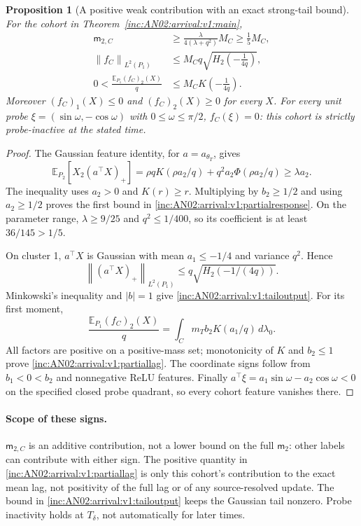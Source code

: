 \documentclass[11pt]{article}
\numberwithin{equation}{section}
\newtheorem{proposition}[theorem]{Proposition}
\theoremstyle{remark}
\newcommand{\E}{\mathbb E}
\newcommand{\dd}{\,d}
\newcommand{\norm}[1]{\left\lVert#1\right\rVert}
\begin{document}
\begin{proposition}[A positive weak contribution with an exact strong-tail bound]
\label{inc:AN02:arrival:v1:observables}
For the cohort in Theorem~\ref{inc:AN02:arrival:v1:main},
\begin{align}
 \mathsf m_{2,C}
 &\ge\frac{\lambda}{4(\lambda+q^2)}M_C
 \ge\frac15M_C,
 \label{inc:AN02:arrival:v1:partialresponse}\\
 \norm{f_C}_{L^2(P_1)}
 &\le M_Cq\sqrt{H_2\!\left(-\frac1{4q}\right)},
 \label{inc:AN02:arrival:v1:tailoutput}\\
 0<\frac{\E_{P_1}(f_C)_2(X)}q
 &\le M_CK\!\left(-\frac1{4q}\right).
 \label{inc:AN02:arrival:v1:partiallag}
\end{align}
Moreover $(f_C)_1(X)\le0$ and $(f_C)_2(X)\ge0$ for every $X$.
For every unit probe $\xi=(\sin\omega,-\cos\omega)$ with
$0\le\omega\le\pi/2$, $f_C(\xi)=0$: this cohort is strictly
probe-inactive at the stated time.
\end{proposition}
\begin{proof}
The Gaussian feature identity, for $a=a_{\theta_T}$, gives
\[
 \E_{P_2}[X_2(a^\top X)_+]
 =\rho qK(\rho a_2/q)+q^2a_2\Phi(\rho a_2/q)
 \ge\lambda a_2.
\]
The inequality uses $a_2>0$ and $K(r)\ge r$.
Multiplying by $b_2\ge1/2$ and using $a_2\ge1/2$ proves the first
bound in \eqref{inc:AN02:arrival:v1:partialresponse}. On the parameter
range, $\lambda\ge9/25$ and $q^2\le1/400$, so its coefficient is at
least $36/145>1/5$.

On cluster 1, $a^\top X$ is Gaussian with mean $a_1\le-1/4$ and
variance $q^2$. Hence
\[
 \norm{(a^\top X)_+}_{L^2(P_1)}
 \le q\sqrt{H_2(-1/(4q))}.
\]
Minkowski's inequality and $|b|=1$ give
\eqref{inc:AN02:arrival:v1:tailoutput}. For its first moment,
\[
 \frac{\E_{P_1}(f_C)_2(X)}q
 =\int_C m_T b_2K(a_1/q)\dd\lambda_0.
\]
All factors are positive on a positive-mass set; monotonicity of $K$
and $b_2\le1$ prove \eqref{inc:AN02:arrival:v1:partiallag}.
The coordinate signs follow from $b_1<0<b_2$ and nonnegative ReLU
features. Finally
$a^\top\xi=a_1\sin\omega-a_2\cos\omega<0$ on the specified closed
probe quadrant, so every cohort feature vanishes there.
\end{proof}

\paragraph{Scope of these signs.}
$\mathsf m_{2,C}$ is an additive contribution, not a lower bound on the
full $\mathsf m_2$: other labels can contribute with either sign.
The positive quantity in \eqref{inc:AN02:arrival:v1:partiallag} is only
this cohort's contribution to the exact mean lag, not positivity of the
full lag or of any source-resolved update. The bound in
\eqref{inc:AN02:arrival:v1:tailoutput} keeps the Gaussian tail nonzero.
Probe inactivity holds at $T_\delta$, not automatically for later times.
\end{document}
